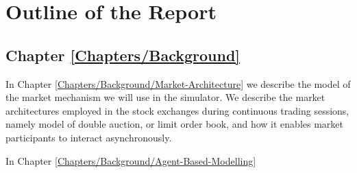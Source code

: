 \section{Outline of the Report \label{Chapters/Introduction/Outline}}

\subsection*{Chapter \ref{Chapters/Background}} 
In Chapter \ref{Chapters/Background/Market-Architecture} we describe the model of the market mechanism we will use in the simulator. We describe the market architectures employed in the stock exchanges during continuous trading sessions, namely model of double auction, or limit order book, and how it enables market participants to interact asynchronously.

In Chapter \ref{Chapters/Background/Agent-Based-Modelling}

